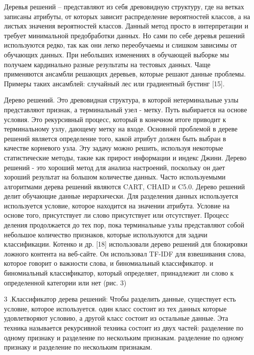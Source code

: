 Деревья решений – представляют из себя древовидную структуру, где на ветках
записаны атрибуты, от которых зависит распределение вероятностей классов, а на
листьях значения вероятностей классов. Данный метод просто в интерпретации и
требует минимальной предобработки данных. Но сами по себе деревья решений
используются редко, так как они легко переобучаемы и слишком зависимы от
обучающих данных. При небольших изменениях в обучающей выборке мы получаем
кардинально разные результаты на тестовых данных. Чаще применяются ансамбли
решающих деревьев, которые решают данные проблемы. Примеры таких ансамблей:
случайный лес или градиентный бустинг [15].~\cite{article9}

Дерево решений. Это древовидная структура, в которой нетерминальные узлы
представляют признак, а терминальный узел - метку. Путь выбирается на основе
условия. Это рекурсивный процесс, который в конечном итоге приводит к
терминальному узлу, дающему метку на входе.
Основной проблемой в дереве решений является определение того, какой атрибут
должен быть выбран в качестве корневого узла. Эту задачу можно решить, используя
некоторые статистические методы, такие как прирост информации и индекс Джини.
Дерево решений - это хороший метод для анализа настроений, поскольку он дает
хороший результат на большом количестве данных. Часто используемыми алгоритмами
дерева решений являются CART, CHAID и C5.0. Дерево решений делит обучающие
данные иерархически. Для разделения данных используется используется условие,
которое находится на значении атрибута. Условие на основе того, присутствует ли
слово присутствует или отсутствует. Процесс деления продолжается до тех пор,
пока терминальные узлы представляют собой небольшое количество признаков,
которые используются для задачи классификации. Котенко и др. [18] использовали
дерево решений для блокировки ложного контента на веб-сайте. Он использовал
TF-IDF для взвешивания слова, которое говорит о важности слова, и биномиальный
классификатор. и биномиальный классификатор, который определяет, принадлежит ли
слово к определенной категории или нет (рис. 3)~\cite{article16}

3 .Классификатор дерева решений: Чтобы разделить данные, существует есть
условие, которое используется. один класс состоит из тех данных которые
удовлетворяют условию, а другой класс состоит из остальные данные. Эта техника
называется рекурсивной техника состоит из двух частей: разделение по одному
признаку и разделение по нескольким признакам. разделение по одному признаку и
разделение по нескольким признакам.~\cite{article18}

